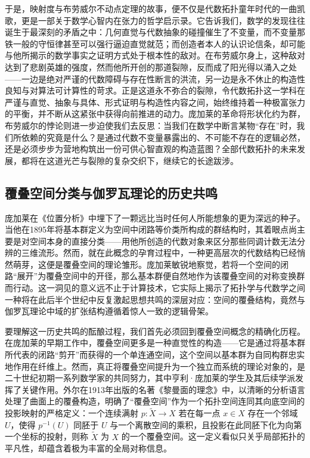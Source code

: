 \documentclass[12pt,a4paper]{article}
\begin{document}
于是，映射度与布劳威尔不动点定理的故事，便不仅是代数拓扑童年时代的一曲凯歌，更是一部关于数学心智内在张力的哲学启示录。它告诉我们，数学的发现往往诞生于最深刻的矛盾之中：几何直觉与代数抽象的碰撞催生了不变量，而不变量那铁一般的守恒律甚至可以强行逼迫直觉就范；而创造者本人的认识论信条，却可能与他所揭示的数学事实之证明方式处于根本性的敌对。在布劳威尔身上，这种敌对达到了悲剧英雄的强度，然而他所开创的那道裂隙，反而成了阳光得以涌入之处——一边是绝对严谨的代数障碍与存在性断言的洪流，另一边是永不休止的构造性良知与对算法可计算性的苛求。正是这道永不弥合的裂隙，令代数拓扑这一学科在严谨与直觉、抽象与具体、形式证明与构造性内容之间，始终维持着一种极富张力的平衡，并不断从这紧张中获得向前推进的动力。庞加莱的革命将形状化约为群，布劳威尔的悖论则进一步迫使我们去反思：当我们在数学中断言某物“存在”时，我们所依赖的究竟是什么？是通过代数不变量暴露出的、不可能不存在的逻辑必然，还是必须步步为营地构筑出一份可供心智直观的构造蓝图？全部代数拓扑的未来发展，都将在这道光芒与裂隙的复杂交织下，继续它的长途跋涉。

\subsection{覆叠空间分类与伽罗瓦理论的历史共鸣}

庞加莱在《位置分析》中埋下了一颗远比当时任何人所能想象的更为深远的种子。当他在1895年将基本群定义为空间中闭路等价类所构成的群结构时，其着眼点尚主要是对空间本身的直接分类——用他所创造的代数对象来区分那些同调计数无法分辨的三维流形。然而，就在此概念的孕育过程中，一种更高层次的代数结构已经悄然萌芽，这便是覆叠空间的理论雏形。庞加莱敏锐地察觉，若将一个空间的闭路“展开”为覆叠空间中的开径，那么基本群便自然地作为该覆叠空间的对称变换群而行动。这一洞见的意义远不止于计算技术，它实际上揭示了拓扑学与代数学之间一种将在此后半个世纪中反复激起思想共鸣的深层对应：空间的覆叠结构，竟然与伽罗瓦理论中域的扩张结构遵循着惊人一致的逻辑骨架。

要理解这一历史共鸣的酝酿过程，我们首先必须回到覆叠空间概念的精确化历程。在庞加莱的早期工作中，覆叠空间更多是一种直觉性的构造——它是通过将基本群所代表的闭路“剪开”而获得的一个单连通空间，这个空间以基本群为自同构群忠实地作用在纤维上。然而，真正将覆叠空间提升为一个独立而系统的理论对象的，是二十世纪初期一系列数学家的共同努力，其中亨利·庞加莱的学生及其后续学派发挥了关键作用。外尔在1913年出版的名著《黎曼面的理念》中，以清晰的分析语言处理了曲面上的覆叠构造，明确了“覆叠空间”作为一个拓扑空间连同其向底空间的投影映射的严格定义：一个连续满射 $p: \tilde{X} \to X$ 若在每一点 $x \in X$ 存在一个邻域 $U$，使得 $p^{-1}(U)$ 同胚于 $U$ 与一个离散空间的乘积，且投影在此同胚下化为向第一个坐标的投射，则称 $\tilde{X}$ 为 $X$ 的一个覆叠空间。这一定义看似只关乎局部拓扑的平凡性，却蕴含着极为丰富的全局对称信息。
\end{document}
